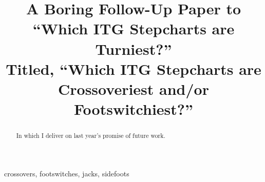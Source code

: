 \documentclass[10pt]{sigplanconf}
\begin{document}
\copyrightdata{}


\title{
A Boring Follow-Up Paper to \\
``Which ITG Stepcharts are Turniest?'' \\
Titled, ``Which ITG Stepcharts are Crossoveriest and/or Footswitchiest?'' \\
}


\maketitle

\begin{abstract}

In which I deliver on last year's promise of future work.

\end{abstract}


\keywords
crossovers, footswitches, jacks, sidefoots
\end{document}

